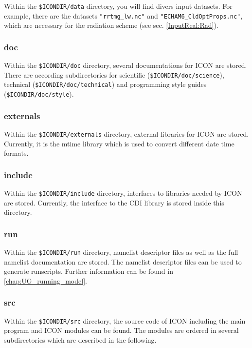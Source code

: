 Within the \verb+$ICONDIR/data+ directory, you will find divers input datasets. For example, there are the datasets \verb+"rrtmg_lw.nc"+ and \verb+"ECHAM6_CldOptProps.nc"+, which are necessary for the radiation scheme (see sec. \ref{InputReal:Rad}). 

\subsubsection{doc}

Within the \verb+$ICONDIR/doc+ directory, several documentations for ICON are stored. There are according subdirectories for scientific (\verb+$ICONDIR/doc/science+), technical (\verb+$ICONDIR/doc/technical+) and programming style guides (\verb+$ICONDIR/doc/style+).

\subsubsection{externals}

Within the \verb+$ICONDIR/externals+ directory, external libraries for ICON are stored. Currently, it is the mtime library which is used to convert different date time formats.

\subsubsection{include}

Within the \verb+$ICONDIR/include+ directory, interfaces to libraries needed by ICON are stored. Currently, the interface to the CDI library is stored inside this directory. 

\subsubsection{run}

Within the \verb+$ICONDIR/run+ directory, namelist descriptor files as well as the full namelist documentation are stored. The namelist descriptor files can be used to generate runscripts. Further information can be found in \ref{chap:UG_running_model}.

\subsubsection{src}

Within the \verb+$ICONDIR/src+ directory, the source code of ICON including the main program and ICON modules can be found. The modules are ordered in several subdirectories which are described in the following. 

